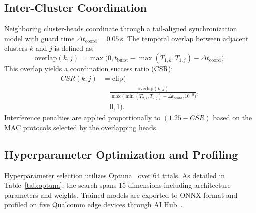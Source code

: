 \subsection{Inter-Cluster Coordination}
Neighboring cluster-heads coordinate through a tail-aligned synchronization model with guard time $\Delta t_{\text{coord}} = 0.05$\,s. The temporal overlap between adjacent clusters $k$ and $j$ is defined as:
\begin{equation}
\text{overlap}(k, j) = \max\big(0, t_{\text{burst}} - \max(T_{1,k}, T_{1,j}) - \Delta t_{\text{coord}}\big).
\end{equation}
This overlap yields a coordination success ratio (CSR):
\begin{equation}
\begin{split}
CSR(k, j) &= \text{clip}\Bigg( \\
&\quad \frac{\text{overlap}(k, j)}{\max\big(\min(T_{2,k}, T_{2,j}) - \Delta t_{\text{coord}}, 10^{-9}\big)}, \\
&\quad 0, 1 \Bigg).
\end{split}
\end{equation}
Interference penalties are applied proportionally to $(1.25 - CSR)$ based on the MAC protocols selected by the overlapping heads.



\subsection{Hyperparameter Optimization and Profiling}
Hyperparameter selection utilizes Optuna~\cite{akiba2019optuna} over 64 trials. As detailed in Table~\ref{tab:optuna}, the search spans 15 dimensions including architecture parameters and weights. Trained models are exported to ONNX format and profiled on five Qualcomm edge devices through AI Hub~\cite{qualcomm2025aihub}.

